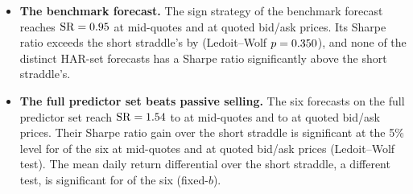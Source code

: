 \begin{itemize}
\item \textbf{The benchmark forecast.} The sign strategy of the benchmark forecast reaches $\mathrm{SR} = 0.95$ at
  mid-quotes and \rhemShXRidgeHar{} at quoted bid/ask prices. Its Sharpe ratio exceeds the short straddle's by
  \rhemDShRidgeHarVsShort{} (Ledoit--Wolf $p = 0.350$), and none of the \rhemHarDistinctWord{}
  distinct HAR-set forecasts has a Sharpe ratio significantly above the short straddle's.
\item \textbf{The full predictor set beats passive selling.} The six forecasts on the full predictor set reach
  $\mathrm{SR} = 1.54$ to \rhrPoolShFullMax{} at mid-quotes and \rhrPoolShXFullMin{} to \rhrPoolShXFullMax{} at
  quoted bid/ask prices. Their Sharpe ratio gain over the short straddle is significant at the 5\% level for
  \rhemFullVsShortSigWord{} of the six at mid-quotes and \rhemFullVsShortSigXWord{} at quoted bid/ask prices
  (Ledoit--Wolf test). The mean daily return differential over the short straddle, a different test, is significant
  for \rhemFullTVsShortSigWord{} of the six (fixed-$b$).

\end{itemize}
